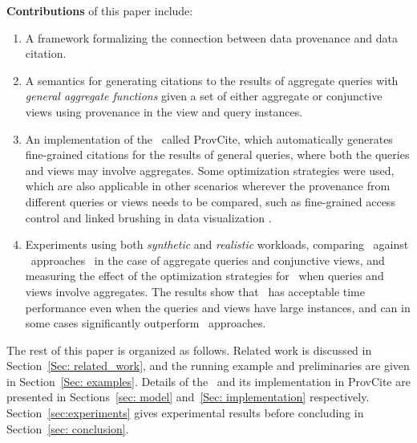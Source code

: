 {\textbf{Contributions}} of this paper include:
\begin{enumerate}
\item A framework formalizing the connection between data provenance and data citation.
\item %
A semantics for generating citations to the results of aggregate queries with {\em general aggregate functions} given a set of either aggregate or conjunctive views using provenance in the view and query instances. 
\item An implementation of the \pba\ called ProvCite, which automatically generates fine-grained citations for the results of general queries, where both the queries and views may involve aggregates. Some optimization strategies were used, which are also applicable in other scenarios wherever the provenance from different queries or views needs to be compared, such as fine-grained access control \cite{goyal2006attribute} and linked brushing in data visualization \cite{psallidas2018smoke}.

\item 
Experiments using both {\em synthetic}  and {\em realistic} workloads, comparing 
\provalg\ against \rba\ approaches~\cite{wu2018data} in the case of aggregate queries and conjunctive views, and measuring the effect of the optimization strategies for \provalg\ when queries and views involve aggregates.  
The results show that \provalg\ has acceptable time performance even when the queries and views have large instances, and can in some cases significantly outperform \rba\ approaches.
\end{enumerate}

The rest of this paper is organized as follows.
Related work is discussed in Section~\ref{Sec: related_work}, and the running example and preliminaries are given in Section~\ref{Sec: examples}.  Details of the \pba\ and its implementation in ProvCite are presented in Sections~\ref{sec: model} and~\ref{Sec: implementation} respectively. Section~\ref{sec:experiments} gives experimental results before concluding in Section~\ref{sec: conclusion}.


